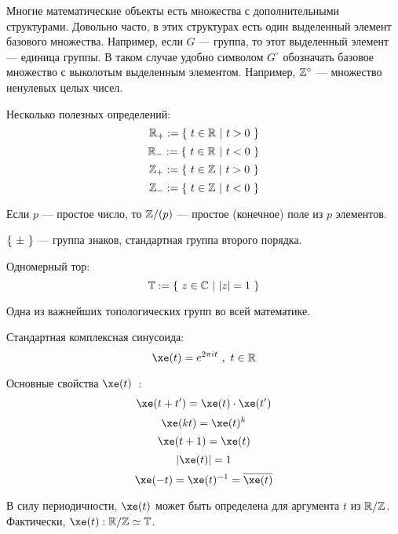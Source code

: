 




\SSCover


\SSbullet

\SSsect Многие математические объекты есть множества с дополнительными структурами.
Довольно часто, в этих структурах есть один выделенный элемент базового множества. 
Например, если \( G \) --- группа, то этот выделенный элемент --- единица группы. 
В таком случае удобно символом \( G^\circ \) обозначать базовое множество с выколотым выделенным элементом.
Например, \( \mathbb{Z}^\circ \) --- множество ненулевых целых чисел.

\SSsect Несколько полезных определений:
\[ \mathbb{R}_+ := \left\lbrace~  t \in \mathbb{R}  ~|~  t>0  ~\right\rbrace \]
\[ \mathbb{R}_- := \left\lbrace~  t \in \mathbb{R}  ~|~  t<0  ~\right\rbrace \]
\[ \mathbb{Z}_+ := \left\lbrace~  t \in \mathbb{Z}  ~|~  t>0  ~\right\rbrace \]
\[ \mathbb{Z}_- := \left\lbrace~  t \in \mathbb{Z}  ~|~  t<0  ~\right\rbrace \]

\SSsect Если \( p \) --- простое число, то \( \mathbb{Z}/(p) \) --- простое (конечное) поле из \( p \) элементов.

\SSsect \( \left\lbrace~\pm~\right\rbrace \) --- группа знаков, стандартная группа второго порядка.

\SSsect Одномерный тор: 
\[ \mathbb{T} := \left\lbrace~  z \in \mathbb{C}  ~|~  |z|=1  ~\right\rbrace \]

Одна из важнейших топологических групп во всей математике.

\SSsect Стандартная комплексная синусоида:
\[ \xe(t) = e^{2 \pi i t} ~,~ t \in \xR \]

\SSsect Основные свойства \( \xe(t) \)~:
\[
\xe(t+t') = \xe(t) \cdot \xe(t')
\]
\[
\xe(kt) = \xe(t)^k
\]
\[
\xe(t+1) = \xe(t)
\]
\[
|\xe(t)| = 1
\]
\[
\xe(-t) = \xe(t)^{-1} = \overline{\xe(t)}
\]

\SSsect В силу периодичности, \( \xe(t) \) может быть определена для аргумента \( t \) из \( \mathbb{R}/\mathbb{Z} \). 
Фактически, \( \xe(t) : \xR/\xZ \simeq \xT \).



